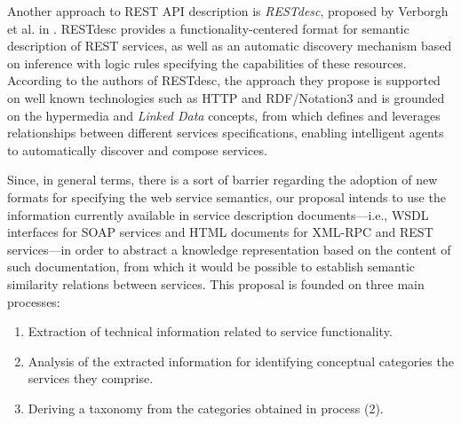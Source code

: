 Another approach to REST API description is \emph{RESTdesc}, proposed by Verborgh et al. in \cite{Verborgh:2013}. RESTdesc provides a functionality-centered format for semantic description of REST services, as well as an automatic discovery mechanism based on inference with logic rules specifying the capabilities of these resources. According to the authors of RESTdesc, the approach they propose is supported on well known technologies such as HTTP and RDF/Notation3 and is grounded on the hypermedia and \emph{Linked Data} concepts, from which defines and leverages relationships between different services specifications, enabling intelligent agents to automatically discover and compose services.

Since, in general terms, there is a sort of barrier regarding the adoption of new formats for specifying the web service semantics, our proposal intends to use the information currently available in service description documents---i.e., WSDL interfaces for SOAP services and HTML documents for XML-RPC and REST services---in order to abstract a knowledge representation based on the content of such documentation, from which it would be possible to establish semantic similarity relations between services. This proposal is founded on three main processes: 

\begin{enumerate}
\item Extraction of technical information related to service functionality. 
\item Analysis of the extracted information for identifying conceptual categories
the services they comprise. 
\item Deriving a taxonomy from the categories obtained in process (2). 
\end{enumerate}

